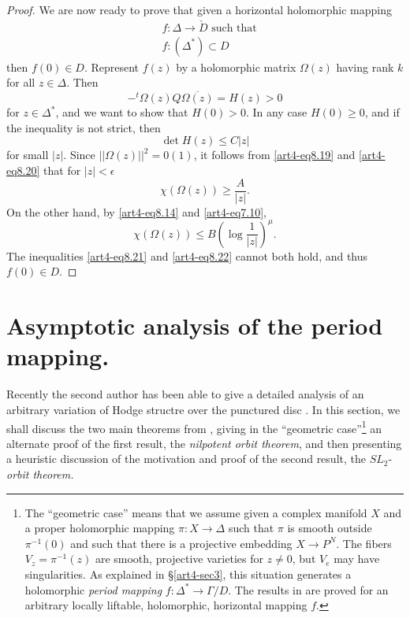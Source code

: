 \begin{proof}
We are now ready to prove that given a horizontal holomorphic mapping
\begin{align*}
& f : \Delta \rightarrow \check{D} \text{ such that}\\
& f: (\Delta^\ast) \subset D
\end{align*}
then $f (0) \in D$. Represent $f(z)$ by a holomorphic matrix $\Omega(z)$ having rank $k$ for all $z \in\Delta$. Then
$$
- {}^t\Omega(z) Q \overline{\Omega(z)} = H (z) > 0
$$
for $z \in \Delta^\ast$, and we want to show that $H(0) >0$. In any case $H (0) \geqslant 0$, and if the inequality is not strict, then 
\begin{equation}
\det H(z) \leqslant C |z|
\label{art4-eq8.20}
\end{equation}\pageoriginale
for small $|z|$. Since $||\Omega(z)||^2 = 0 (1)$, it follows from \eqref{art4-eq8.19} and \eqref{art4-eq8.20} that for $|z| <\epsilon$
\begin{equation}\label{art4-eq8.21}
\chi (\Omega (z)) \geqslant \frac{A}{|z|}.
\end{equation}
On the other hand, by \eqref{art4-eq8.14} and \eqref{art4-eq7.10},
\begin{equation}
\chi (\Omega(z)) \leqslant B \left(\log \frac{1}{|z|} \right)^\mu.
\label{art4-eq8.22}
\end{equation}
The inequalities \eqref{art4-eq8.21} and \eqref{art4-eq8.22} cannot both hold, and thus $f(0) \in D$.
\end{proof}

\section{Asymptotic analysis of the period mapping.}\label{art4-sec9}
Recently the second author has been able to give a detailed analysis of an arbitrary variation of Hodge structre over the punctured disc \cite{art4-key41}. In this section, we shall discuss the two main theorems from \cite{art4-key41}, giving in  the ``geometric case''\footnote[37]{The ``geometric case'' means that we assume given a complex manifold $X$ and a proper holomorphic mapping $\pi: X \to \Delta$ such that $\pi$ is smooth outside $\pi^{-1} (0)$ and such that there is a projective embedding $X \to P^N$. The fibers $V_z = \pi^{-1} (z)$ are smooth, projective varieties for $z \neq 0$, but $V_e$ may have singularities. As explained in \S \ref{art4-sec3}, this situation generates a holomorphic \textit{period mapping} $f : \Delta^\ast \to \Gamma/ D$. The results in \cite{art4-key41} are proved for an arbitrary locally liftable, holomorphic, horizontal mapping $f$.} an alternate proof of the first result, the \textit{nilpotent orbit theorem}, and then presenting a heuristic discussion of the motivation and proof of the second result, the $SL_2$-\textit{orbit theorem.}

